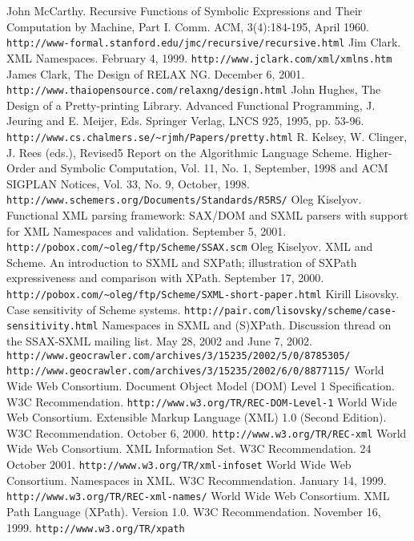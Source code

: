 \documentclass[10pt]{article}
\begin{document}
\begin{thebibliography}{}
 John McCarthy. Recursive Functions of Symbolic Expressions
and Their Computation by Machine, Part I. Comm. ACM, 3(4):184-195, April 1960. \texttt{http://www-formal.stanford.edu/jmc/recursive/recursive.html} 
 Jim Clark. XML Namespaces. February 4, 1999. \texttt{http://www.jclark.com/xml/xmlns.htm} 
 James Clark, The Design of RELAX NG. December 6, 2001. \texttt{http://www.thaiopensource.com/relaxng/design.html} 
 John Hughes, The Design of a Pretty-printing Library. Advanced Functional Programming, J. Jeuring and E. Meijer, Eds. Springer Verlag, LNCS 925, 1995, pp. 53-96. \texttt{http://www.cs.chalmers.se/\textasciitilde{}rjmh/Papers/pretty.html} 
 R. Kelsey, W. Clinger, J. Rees (eds.), Revised5 Report on
                      the Algorithmic Language Scheme. Higher-Order and
                      Symbolic Computation, Vol. 11, No. 1, September, 1998
                      and
                      ACM SIGPLAN Notices, Vol. 33, No. 9, October, 1998. \texttt{http://www.schemers.org/Documents/Standards/R5RS/} 
 Oleg Kiselyov. Functional XML parsing framework: SAX/DOM and
SXML parsers with support for XML Namespaces and validation. September
5, 2001. \texttt{http://pobox.com/\textasciitilde{}oleg/ftp/Scheme/SSAX.scm} 
 Oleg Kiselyov. XML and Scheme. An introduction to SXML and SXPath;
illustration of SXPath expressiveness and comparison with
XPath. September 17, 2000. \texttt{http://pobox.com/\textasciitilde{}oleg/ftp/Scheme/SXML-short-paper.html} 
 Kirill Lisovsky. Case sensitivity of Scheme systems. \texttt{http://pair.com/lisovsky/scheme/case-sensitivity.html} 
 Namespaces in SXML and (S)XPath. Discussion thread on the SSAX-SXML mailing list. May 28, 2002 and June 7, 2002. \texttt{http://www.geocrawler.com/archives/3/15235/2002/5/0/8785305/}  \texttt{http://www.geocrawler.com/archives/3/15235/2002/6/0/8877115/} 
 World Wide Web Consortium. Document Object Model (DOM) Level 1
Specification. W3C Recommendation. \texttt{http://www.w3.org/TR/REC-DOM-Level-1} 
 World Wide Web Consortium. Extensible Markup Language (XML)
1.0 (Second Edition). W3C Recommendation. October 6, 2000. \texttt{http://www.w3.org/TR/REC-xml} 
 World Wide Web Consortium. XML Information Set.  W3C Recommendation. 24 October 2001. \texttt{http://www.w3.org/TR/xml-infoset} 
 World Wide Web Consortium. Namespaces in XML. W3C Recommendation. January 14, 1999. \texttt{http://www.w3.org/TR/REC-xml-names/} 
 World Wide Web Consortium. XML Path Language (XPath).
Version 1.0. W3C Recommendation. November 16, 1999. \texttt{http://www.w3.org/TR/xpath} 
\end{thebibliography}
\end{document}
